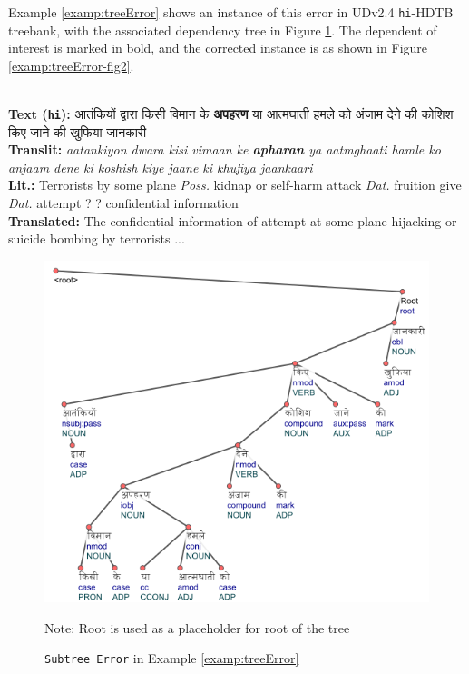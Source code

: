 Example \ref{examp:treeError} shows an instance of this error in UDv2.4 \texttt{hi}-HDTB treebank, with the associated dependency tree in Figure \ref{examp:treeError-fig}. The dependent of interest is marked in bold, and the corrected instance is as shown in Figure \ref{examp:treeError-fig2}.
\begin{example}
\label{examp:treeError}
\textbf{ }\\
\textbf{Text (\texttt{hi}):} \texthindi{आतंकियों द्वारा किसी विमान के \textbf{अपहरण} या आत्मघाती हमले को अंजाम देने की कोशिश किए जाने की खुफिया जानकारी}\\
\textbf{Translit:} \textit{aatankiyon dwara kisi vimaan ke \textbf{apharan} ya aatmghaati hamle ko anjaam dene ki koshish kiye jaane ki khufiya jaankaari}\\
\textbf{Lit.:} Terrorists by some plane \textit{Poss.} kidnap or self-harm attack \textit{Dat.} fruition give \textit{Dat.} attempt ? ? confidential information\\
\textbf{Translated:} The confidential information of attempt at some plane hijacking or suicide bombing by terrorists ...
\end{example}

\begin{figure}[h]
    \centering
    \includegraphics[scale=0.7]{img/treeError.png}
    \caption{\texttt{Subtree Error} in Example \ref{examp:treeError}}
    \label{examp:treeError-fig}
    Note: Root is used as a placeholder for root of the tree
\end{figure}

